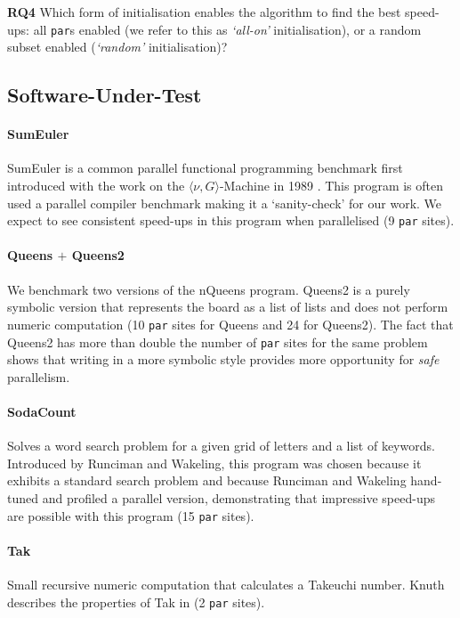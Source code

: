 \noindent\textbf{RQ4} Which form of initialisation enables the algorithm to find the best speed-ups: all \verb-par-s enabled (we refer to this as \emph{`all-on'} initialisation), or a random subset enabled (\emph{`random'} initialisation)?

\subsection{Software-Under-Test}

\paragraph{SumEuler}
SumEuler is a common parallel functional programming benchmark first introduced
with the work on the $\langle\nu, G\rangle$-Machine in 1989 \citep{vGMachine}.
This program is often used a parallel compiler benchmark making it a `sanity-check'
for our work. We expect to see consistent speed-ups in this program when parallelised (9 \verb-par- sites).

\paragraph{Queens $+$ Queens2}
We benchmark two versions of the nQueens program. Queens2 is a purely symbolic
version that represents the board as a list of lists and does not perform
numeric computation (10 \verb-par- sites for Queens and 24 for Queens2). The fact
that Queens2 has more than double the number of \verb-par- sites for the same
problem shows that writing in a more symbolic style provides more opportunity
for \emph{safe} parallelism.

\paragraph{SodaCount}
Solves a word search problem for a given grid of letters
and a list of keywords.  Introduced by Runciman and Wakeling, this program was
chosen because it exhibits a standard search problem and because Runciman and
Wakeling hand-tuned and profiled a parallel version, demonstrating
that impressive speed-ups are possible with this program
\citep{Runciman:1996:AFP:242105} (15 \verb-par- sites).

\paragraph{Tak}
Small recursive numeric computation that calculates a Takeuchi number. Knuth
describes the properties of Tak in \citep{ExamplesOfRecursion} (2 \verb-par- sites).

